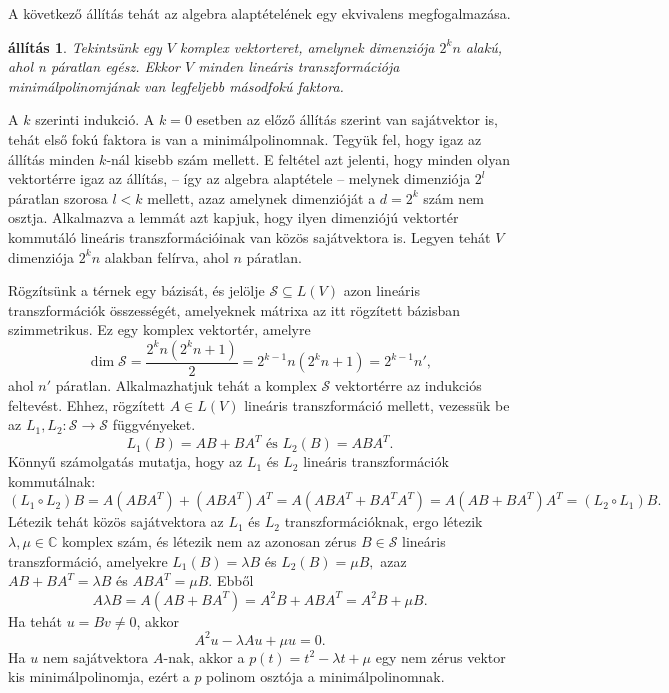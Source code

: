 \documentclass[9pt, showtrims]{memoir}
\makeatletter
\renewenvironment{proof}[1][\proofname]
    {\par\pushQED{\qed}%
    \normalfont \topsep6\p@\@plus6\p@\relax
    \trivlist
    \item[\hskip\labelsep
        \itshape
    #1\@addpunct{:}]\ignorespaces}
    {\popQED\endtrivlist\@endpefalse}
\theoremstyle{plain}
\newtheorem{proposition}{állítás}[section]
\theoremstyle{remark}
\theoremstyle{definition}
\makeatother
\begin{document}
A következő állítás tehát az algebra alaptételének egy ekvivalens megfogalmazása.
\begin{proposition}
    Tekintsünk egy $V$ komplex vektorteret, amelynek dimenziója $2^kn$ alakú,
    ahol n páratlan egész.
    Ekkor $V$ minden lineáris transzformációja minimálpolinomjának 
    van legfeljebb másodfokú faktora.
\end{proposition}
\begin{proof}
    A $k$ szerinti indukció.
    A $k=0$ esetben az előző állítás szerint van sajátvektor is, 
    tehát első fokú faktora is van a minimálpolinomnak.
    Tegyük fel, hogy igaz az állítás minden $k$-nál kisebb szám mellett.
    E feltétel azt jelenti, hogy minden olyan vektortérre igaz az állítás,
    -- így az algebra alaptétele --
    melynek dimenziója $2^l$ páratlan szorosa $l<k$ mellett, 
    azaz amelynek dimenzióját a $d=2^k$ szám nem osztja.
    Alkalmazva a lemmát azt kapjuk, hogy ilyen dimenziójú vektortér kommutáló
    lineáris transzformációinak van közös sajátvektora is.
    Legyen tehát $V$ dimenziója $2^kn$ alakban felírva, ahol $n$ páratlan.

    Rögzítsünk a térnek egy bázisát, és jelölje
    \(
        \mathcal{S}\subseteq L(V)
    \)
    azon lineáris transzformációk összességét, 
    amelyeknek mátrixa az itt rögzített bázisban szimmetrikus.
    Ez egy komplex vektortér,
    amelyre
    \[
        \operatorname{dim}\mathcal{S}=
        \frac{2^kn\left( 2^kn+1 \right)}{2}=
        2^{k-1}n\left(2^kn+1  \right)=
        2^{k-1}n',
    \]
    ahol $n'$ páratlan.
    Alkalmazhatjuk tehát a komplex $\mathcal{S}$ vektortérre az indukciós feltevést.
    Ehhez, rögzített $A\in L\left( V \right)$ lineáris transzformáció mellett, 
    vezessük be az $L_1,L_2:\mathcal{S}\to\mathcal{S}$ függvényeket.
    \[
        L_1\left( B \right)=AB+BA^T \text{ és }
        L_2\left( B \right)=ABA^T.
    \]
    Könnyű számolgatás mutatja, hogy az $L_1$ és $L_2$ lineáris transzformációk kommutálnak:
    \[
        \left( L_1\circ L_2\right)B=
        A\left( ABA^T \right)+\left( ABA^T \right)A^T=
        A\left( ABA^T+BA^TA^T \right)=
        A\left( AB+BA^T \right)A^T =
        \left( L_2\circ L_1 \right)B.
    \]
    Létezik tehát közös sajátvektora az $L_1$ és $L_2$ transzformációknak, ergo
    létezik $\lambda,\mu\in\mathbb{C}$ komplex szám, 
    és létezik nem az azonosan zérus $B\in\mathcal{S}$ lineáris transzformáció,
    amelyekre 
    $
    L_1\left( B \right)=\lambda B
    $
    és
    $
    L_2\left( B \right)=\mu B,
    $
    azaz
    $
    AB+BA^T=\lambda B
    $
    és
    $
    ABA^T=\mu B.
    $
    Ebből
    \[
        A\lambda B=
        A\left( AB+BA^T \right)=
        A^2B + ABA^T=
        A^2B + \mu B.
    \]
    Ha tehát $u=Bv\neq 0$, akkor
    \[
        A^2u-\lambda Au+\mu u=0.
    \]
    Ha $u$ nem sajátvektora $A$-nak, akkor a 
    $p\left( t \right)=t^2-\lambda t+\mu$
    egy nem zérus vektor kis minimálpolinomja, 
    ezért a $p$ polinom osztója a minimálpolinomnak.
\end{proof}
\end{document}
